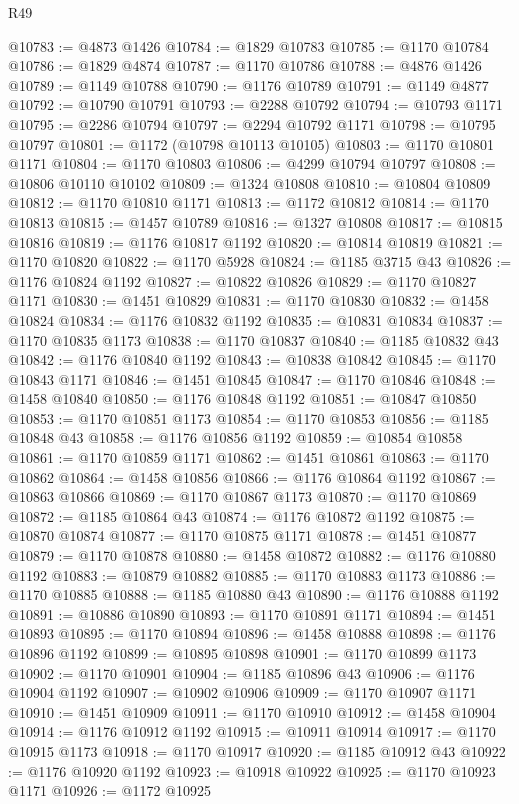 \begin{lexlean}{R49}
\begin{coremodule}
@10783 := @4873 @1426
@10784 := @1829 @10783
@10785 := @1170 @10784
@10786 := @1829 @4874
@10787 := @1170 @10786
@10788 := @4876 @1426
@10789 := @1149 @10788
@10790 := @1176 @10789
@10791 := @1149 @4877
@10792 := @10790 @10791
@10793 := @2288 @10792
@10794 := @10793 @1171
@10795 := @2286 @10794
@10797 := @2294 @10792 @1171
@10798 := @10795 @10797
@10801 := @1172 (@10798 @10113 @10105)
@10803 := @1170 @10801 @1171
@10804 := @1170 @10803
@10806 := @4299 @10794 @10797
@10808 := @10806 @10110 @10102
@10809 := @1324 @10808
@10810 := @10804 @10809
@10812 := @1170 @10810 @1171
@10813 := @1172 @10812
@10814 := @1170 @10813
@10815 := @1457 @10789
@10816 := @1327 @10808
@10817 := @10815 @10816
@10819 := @1176 @10817 @1192
@10820 := @10814 @10819
@10821 := @1170 @10820
@10822 := @1170 @5928
@10824 := @1185 @3715 @43
@10826 := @1176 @10824 @1192
@10827 := @10822 @10826
@10829 := @1170 @10827 @1171
@10830 := @1451 @10829
@10831 := @1170 @10830
@10832 := @1458 @10824
@10834 := @1176 @10832 @1192
@10835 := @10831 @10834
@10837 := @1170 @10835 @1173
@10838 := @1170 @10837
@10840 := @1185 @10832 @43
@10842 := @1176 @10840 @1192
@10843 := @10838 @10842
@10845 := @1170 @10843 @1171
@10846 := @1451 @10845
@10847 := @1170 @10846
@10848 := @1458 @10840
@10850 := @1176 @10848 @1192
@10851 := @10847 @10850
@10853 := @1170 @10851 @1173
@10854 := @1170 @10853
@10856 := @1185 @10848 @43
@10858 := @1176 @10856 @1192
@10859 := @10854 @10858
@10861 := @1170 @10859 @1171
@10862 := @1451 @10861
@10863 := @1170 @10862
@10864 := @1458 @10856
@10866 := @1176 @10864 @1192
@10867 := @10863 @10866
@10869 := @1170 @10867 @1173
@10870 := @1170 @10869
@10872 := @1185 @10864 @43
@10874 := @1176 @10872 @1192
@10875 := @10870 @10874
@10877 := @1170 @10875 @1171
@10878 := @1451 @10877
@10879 := @1170 @10878
@10880 := @1458 @10872
@10882 := @1176 @10880 @1192
@10883 := @10879 @10882
@10885 := @1170 @10883 @1173
@10886 := @1170 @10885
@10888 := @1185 @10880 @43
@10890 := @1176 @10888 @1192
@10891 := @10886 @10890
@10893 := @1170 @10891 @1171
@10894 := @1451 @10893
@10895 := @1170 @10894
@10896 := @1458 @10888
@10898 := @1176 @10896 @1192
@10899 := @10895 @10898
@10901 := @1170 @10899 @1173
@10902 := @1170 @10901
@10904 := @1185 @10896 @43
@10906 := @1176 @10904 @1192
@10907 := @10902 @10906
@10909 := @1170 @10907 @1171
@10910 := @1451 @10909
@10911 := @1170 @10910
@10912 := @1458 @10904
@10914 := @1176 @10912 @1192
@10915 := @10911 @10914
@10917 := @1170 @10915 @1173
@10918 := @1170 @10917
@10920 := @1185 @10912 @43
@10922 := @1176 @10920 @1192
@10923 := @10918 @10922
@10925 := @1170 @10923 @1171
@10926 := @1172 @10925

\end{coremodule}
\end{lexlean}
